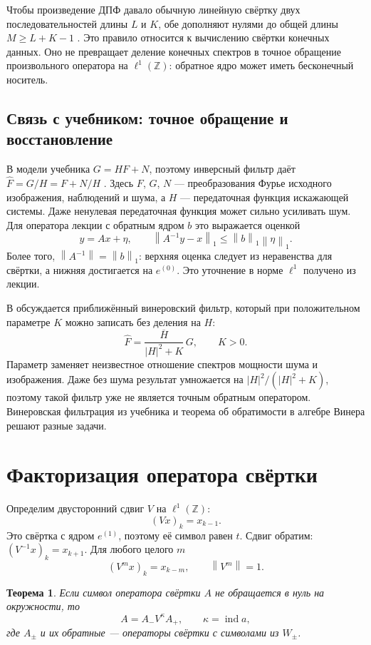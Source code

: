 \documentclass[12pt,a4paper]{article}
\newtheorem{theorem}{Теорема}
\theoremstyle{definition}
\theoremstyle{remark}
\newcommand{\ZZ}{\mathbb{Z}}
\newcommand{\norm}[1]{\left\lVert #1\right\rVert}
\DeclareMathOperator{\ind}{ind}
\begin{document}
Чтобы произведение ДПФ давало обычную линейную свёртку двух
последовательностей длины $L$ и $K$, обе дополняют нулями
до общей длины $M\geqslant L+K-1$
\cite[\S\,4.6.6, с.~298--300]{GW2012}. Это правило относится
к вычислению свёртки конечных данных. Оно не превращает деление
конечных спектров в точное обращение произвольного оператора
на $\ell^1(\ZZ)$: обратное ядро может иметь бесконечный носитель.

\subsection{Связь с учебником: точное обращение и восстановление}

В модели учебника $G=HF+N$, поэтому инверсный фильтр даёт
$\widehat F=G/H=F+N/H$ \cite[\S\,5.7, с.~412]{GW2012}.
Здесь $F$, $G$, $N$ --- преобразования Фурье исходного изображения,
наблюдений и шума, а $H$ --- передаточная функция искажающей системы.
Даже ненулевая передаточная функция может сильно усиливать шум.
Для оператора лекции с обратным ядром $b$ это выражается оценкой
\[
  y=Ax+\eta,\qquad
  \norm{A^{-1}y-x}_1\leqslant\norm{b}_1\norm{\eta}_1.
\]
Более того, $\norm{A^{-1}}=\norm{b}_1$: верхняя оценка следует
из неравенства для свёртки, а нижняя достигается на $e^{(0)}$.
Это уточнение в норме $\ell^1$ получено из лекции.

В \cite[\S\,5.8, с.~414--416]{GW2012} обсуждается приближённый
винеровский фильтр, который при положительном параметре $K$
можно записать без деления на $H$:
\[
  \widehat F=\frac{\overline H}{|H|^2+K}\,G,\qquad K>0.
\]
Параметр заменяет неизвестное отношение спектров мощности шума
и изображения. Даже без шума результат умножается на
$|H|^2/(|H|^2+K)$, поэтому такой фильтр уже не является точным
обратным оператором. Винеровская фильтрация из учебника и теорема
об обратимости в алгебре Винера решают разные задачи.

\section{Факторизация оператора свёртки}

Определим двусторонний сдвиг $V$ на $\ell^1(\ZZ)$:
\[
  (Vx)_k=x_{k-1}.
\]
Это свёртка с ядром $e^{(1)}$, поэтому её символ равен $t$.
Сдвиг обратим: $(V^{-1}x)_k=x_{k+1}$. Для любого целого $m$
\[
  (V^mx)_k=x_{k-m},\qquad \norm{V^m}=1.
\]

\begin{theorem}
Если символ оператора свёртки $A$ не обращается в нуль на окружности,
то
\[
  \boxed{A=A_-V^\kappa A_+},\qquad \kappa=\ind a,
\]
где $A_\pm$ и их обратные --- операторы свёртки с символами
из $W_\pm$.
\end{theorem}
\end{document}
